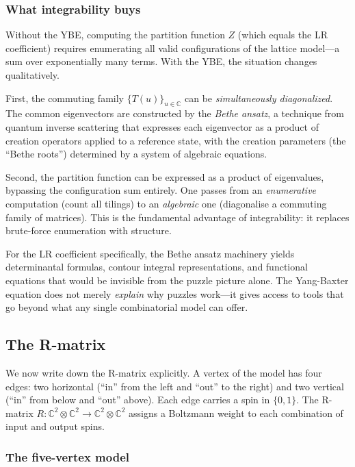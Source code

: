 \subsubsection*{What integrability buys}

Without the YBE, computing the partition function $Z$ (which equals
the LR coefficient) requires enumerating all valid configurations of
the lattice model---a sum over exponentially many terms.  With the
YBE, the situation changes qualitatively.

First, the commuting family $\{T(u)\}_{u \in \mathbb{C}}$ can be
\emph{simultaneously diagonalized}.  The common eigenvectors are
constructed by the \emph{Bethe ansatz}, a technique from quantum
inverse scattering that expresses each eigenvector as a product of
creation operators applied to a reference state, with the creation
parameters (the ``Bethe roots'') determined by a system of algebraic
equations.

Second, the partition function can be expressed as a product of
eigenvalues, bypassing the configuration sum entirely.  One passes
from an \emph{enumerative} computation (count all tilings) to an
\emph{algebraic} one (diagonalise a commuting family of matrices).
This is the fundamental advantage of integrability: it replaces
brute-force enumeration with structure.

For the LR coefficient specifically, the Bethe ansatz machinery
yields determinantal formulas, contour integral representations, and
functional equations that would be invisible from the puzzle picture
alone.  The Yang-Baxter equation does not merely \emph{explain} why
puzzles work---it gives access to tools that go beyond what any
single combinatorial model can offer.

\subsection{The R-matrix}
\label{sec:lattice-rmatrix}

We now write down the R-matrix explicitly.  A vertex of the model
has four edges: two horizontal (``in'' from the left and ``out'' to
the right) and two vertical (``in'' from below and ``out'' above).
Each edge carries a spin in $\{0, 1\}$.  The R-matrix
$R \colon \mathbb{C}^2 \otimes \mathbb{C}^2 \to \mathbb{C}^2 \otimes
\mathbb{C}^2$ assigns a Boltzmann weight to each combination of input
and output spins.

\subsubsection*{The five-vertex model}

